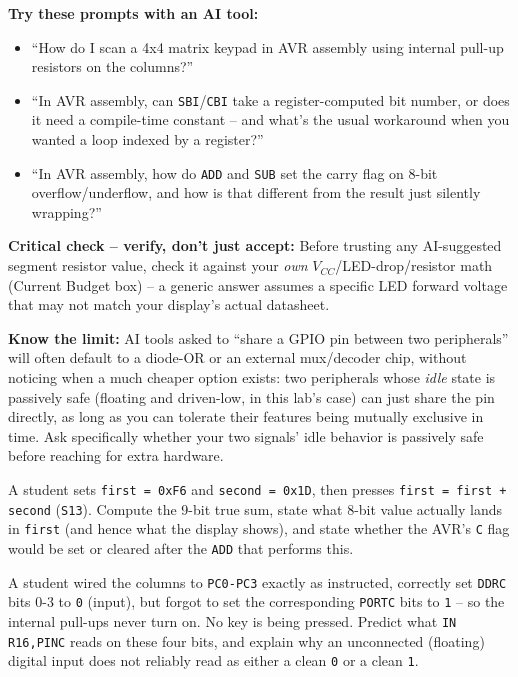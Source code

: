 \documentclass[11pt]{article}
\begin{document}
\begin{aicollab}
\textbf{Try these prompts with an AI tool:}
\begin{itemize}[leftmargin=*,nosep]
  \item ``How do I scan a 4x4 matrix keypad in AVR assembly using internal
        pull-up resistors on the columns?''
  \item ``In AVR assembly, can \texttt{SBI}/\texttt{CBI} take a
        register-computed bit number, or does it need a compile-time constant --
        and what's the usual workaround when you wanted a loop indexed by a
        register?''
  \item ``In AVR assembly, how do \texttt{ADD} and \texttt{SUB} set the carry
        flag on 8-bit overflow/underflow, and how is that different from the
        result just silently wrapping?''
\end{itemize}

\medskip\textbf{Critical check -- verify, don't just accept:}
Before trusting any AI-suggested segment resistor value, check it against your
\emph{own} $V_{CC}$/LED-drop/resistor math (Current Budget box) -- a generic
answer assumes a specific LED forward voltage that may not match your display's
actual datasheet.

\medskip\textbf{Know the limit:}
AI tools asked to ``share a GPIO pin between two peripherals'' will often default
to a diode-OR or an external mux/decoder chip, without noticing when a much
cheaper option exists: two peripherals whose \emph{idle} state is passively safe
(floating and driven-low, in this lab's case) can just share the pin directly, as
long as you can tolerate their features being mutually exclusive in time. Ask
specifically whether your two signals' idle behavior is passively safe before
reaching for extra hardware.
\end{aicollab}

\takehomebanner

\begin{trace}
A student sets \texttt{first = 0xF6} and \texttt{second = 0x1D}, then presses
\texttt{first = first + second} (\texttt{S13}). Compute the 9-bit true sum, state
what 8-bit value actually lands in \texttt{first} (and hence what the display
shows), and state whether the AVR's \texttt{C} flag would be set or cleared after
the \texttt{ADD} that performs this.
\end{trace}

\begin{bug}
A student wired the columns to \texttt{PC0-PC3} exactly as instructed, correctly
set \texttt{DDRC} bits 0-3 to \texttt{0} (input), but forgot to set the
corresponding \texttt{PORTC} bits to \texttt{1} -- so the internal pull-ups never
turn on. No key is being pressed. Predict what \texttt{IN R16,PINC} reads on
these four bits, and explain why an unconnected (floating) digital input does not
reliably read as either a clean \texttt{0} or a clean \texttt{1}.
\end{bug}
\end{document}
